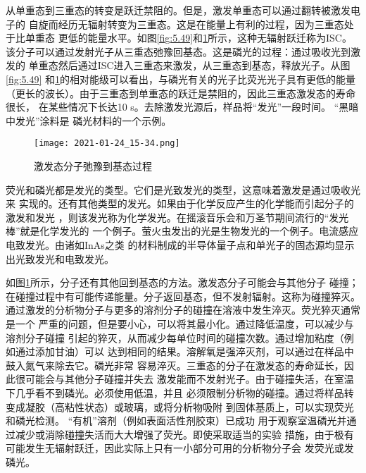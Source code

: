 从单重态到三重态的转变是跃迁禁阻的。但是，激发单重态可以通过翻转被激发电子的
自旋而经历无辐射转变为三重态。这是在能量上有利的过程，因为三重态处于比单重态
更低的能量水平。如图\ref{fig:5.49}和\ref{fig:5.50}所示，这种无辐射跃迁称为ISC。
该分子可以通过发射光子从三重态弛豫回基态。这是磷光的过程：通过吸收光到激发的
单重态然后通过ISC进入三重态来激发，从三重态到基态，释放光子。从图\ref{fig:5.49}
和\ref{fig:5.50}的相对能级可以看出，与磷光有关的光子比荧光光子具有更低的能量
（更长的波长）。由于三重态到单重态的跃迁是禁阻的，因此三重态激发态的寿命很长，
在某些情况下长达10 s。去除激发光源后，样品将“发光”一段时间。 “黑暗中发光”涂料是
磷光材料的一个示例。
\begin{figure}[htpb]
    \centering
    \texttt{[image: 2021-01-24\_15-34.png]}
    \caption{激发态分子弛豫到基态过程}
    \label{fig:5.50}
\end{figure}

荧光和磷光都是发光的类型。它们是光致发光的类型，这意味着激发是通过吸收光来
实现的。还有其他类型的发光。如果由于化学反应产生的化学能而引起分子的激发和发光
，则该发光称为化学发光。在摇滚音乐会和万圣节期间流行的“发光棒”就是化学发光的
一个例子。萤火虫发出的光是生物发光的一个例子。电流感应电致发光。由诸如InAs之类
的材料制成的半导体量子点和单光子的固态源均显示出光致发光和电致发光。

如图\ref{fig:5.50}所示，分子还有其他回到基态的方法。激发态分子可能会与其他分子
碰撞；在碰撞过程中有可能传递能量。分子返回基态，但不发射辐射。这称为碰撞猝灭。
通过激发的分析物分子与更多的溶剂分子的碰撞在溶液中发生淬灭。荧光猝灭通常是一个
严重的问题，但是要小心，可以将其最小化。通过降低温度，可以减少与溶剂分子碰撞
引起的猝灭，从而减少每单位时间的碰撞次数。通过增加粘度（例如通过添加甘油）可以
达到相同的结果。溶解氧是强淬灭剂，可以通过在样品中鼓入氮气来除去它。磷光非常
容易淬灭。三重态的分子在激发态的寿命延长，因此很可能会与其他分子碰撞并失去
激发能而不发射光子。由于碰撞失活，在室温下几乎看不到磷光。必须使用低温，并且
必须限制分析物的碰撞。通过将样品转变成凝胶（高粘性状态）或玻璃，或将分析物吸附
到固体基质上，可以实现荧光和磷光检测。 “有机”溶剂（例如表面活性剂胶束）已成功
用于观察室温磷光并通过减少或消除碰撞失活而大大增强了荧光。即使采取适当的实验
措施，由于极有可能发生无辐射跃迁，因此实际上只有一小部分可用的分析物分子会
发荧光或发磷光。
